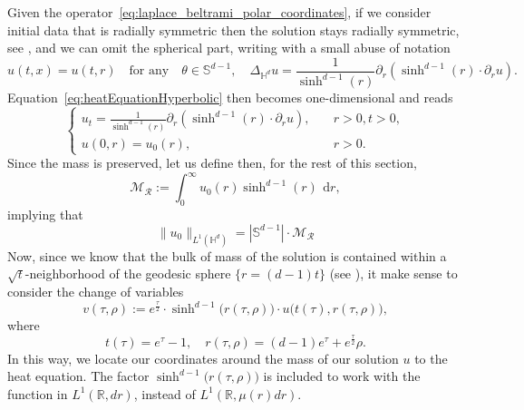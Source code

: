 \documentclass[12pt,longbibliography]{article}
\def\S{\mathbb{S}}
\def\d{\,\mathrm{d}}
\def\d{\,\mathrm{d}}
\def\H{\mathbb{H}}
\theoremstyle{definition}
\theoremstyle{remark}
\theoremstyle{example}
\begin{document}
Given the operator~\eqref{eq:laplace_beltrami_polar_coordinates}, if we consider initial data that is radially symmetric then the solution stays radially symmetric, see \cite{vazquez1992asymptotic}, and we can omit the spherical part, writing with a small abuse of notation
\[
u(t, x)= u(t,r)\quad\text{for any}\quad \theta \in\mathbb{S}^{d-1},\quad \Delta_{\H^d} u = \frac{1}{\sinh^{d-1}(r)}\partial_r\left(\sinh^{d-1}(r)\cdot \partial_r u\right).
\]
Equation~\eqref{eq:heatEquationHyperbolic} then becomes one-dimensional and reads
\begin{equation}\label{eq:heatEquation_radial_solutions}
	\begin{cases}
		u_t = \frac{1}{\sinh^{d-1}(r)}\partial_r\left(\sinh^{d-1}(r)\cdot \partial_r u\right), \quad &r>0, t>0,\\
		u(0,r)=u_0(r), & r>0.
	\end{cases}
\end{equation}
Since the mass is preserved, let us define then, for the rest of this section,
\[
\mathcal{M}_{\mathcal{R}}:=\int_0^\infty u_0(r)\sinh^{d-1}(r)\ \d r,
\]
implying that
\[
\|u_0\|_{L^1(\mathbb{H}^d)}=|\S^{d-1}|\cdot \mathcal{M}_{\mathcal{R}}
\]
Now, since we know that the bulk of mass of the solution is contained within a $\sqrt{t}$-neighborhood of the geodesic sphere $\{r= (d-1)t\}$ (see \cite{vazquez1992asymptotic}), it make sense to consider the change of variables
\[
v(\tau, \rho):=e^\frac{\tau}{2}\cdot\sinh^{d-1}\big(r(\tau,\rho)\big)\cdot u\big(t(\tau), r(\tau,\rho)\big),
\]
where
\[
t(\tau)=e^\tau-1,\quad r(\tau,\rho)= (d-1)e^\tau  + e^\frac{\tau}{2}\rho.
\]
In this way, we locate our coordinates around the mass of our solution $u$ to the heat equation. The factor $\sinh^{d-1}\big(r(\tau,\rho)\big)$ is included to work with the function in $L^1(\mathbb{R},dr)$, instead of $L^1(\mathbb{R},\mu (r)dr)$.
\end{document}
